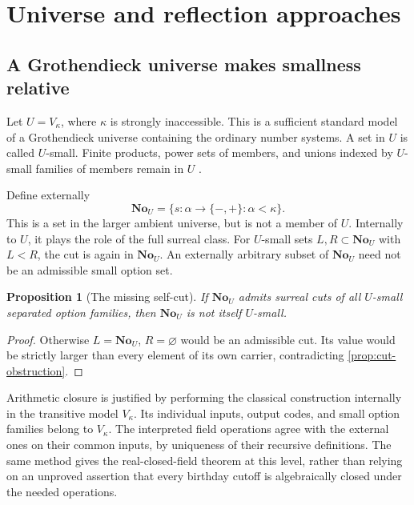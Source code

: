 \documentclass[11pt,letterpaper]{article}
\newtheorem{proposition}[theorem]{Proposition}
\theoremstyle{definition}
\theoremstyle{remark}
\newcommand{\No}{\mathbf{No}}
\numberwithin{equation}{section}
\begin{document}
\section{Universe and reflection approaches}\label{sec:universes}

\subsection{A Grothendieck universe makes smallness relative}
Let \(U=V_\kappa\), where \(\kappa\) is strongly inaccessible. This is a sufficient standard model of a Grothendieck universe containing the ordinary number systems. A set in \(U\) is called \(U\)-small. Finite products, power sets of members, and unions indexed by \(U\)-small families of members remain in \(U\) \cite[\S8]{ShulmanSize}.

Define externally
\begin{equation}\label{eq:NoU}
 \No_U=\{s:\alpha\to\{-,+\}:\alpha<\kappa\}.
\end{equation}
This is a set in the larger ambient universe, but is not a member of \(U\). Internally to \(U\), it plays the role of the full surreal class. For \(U\)-small sets \(L,R\subset\No_U\) with \(L<R\), the cut is again in \(\No_U\). An externally arbitrary subset of \(\No_U\) need not be an admissible small option set.

\begin{proposition}[The missing self-cut]\label{prop:universecut}
If \(\No_U\) admits surreal cuts of all \(U\)-small separated option families, then \(\No_U\) is not itself \(U\)-small.
\end{proposition}
\begin{proof}
Otherwise \(L=\No_U\), \(R=\varnothing\) would be an admissible cut. Its value would be strictly larger than every element of its own carrier, contradicting \cref{prop:cut-obstruction}.
\end{proof}

Arithmetic closure is justified by performing the classical construction internally in the transitive model \(V_\kappa\). Its individual inputs, output codes, and small option families belong to \(V_\kappa\). The interpreted field operations agree with the external ones on their common inputs, by uniqueness of their recursive definitions. The same method gives the real-closed-field theorem at this level, rather than relying on an unproved assertion that every birthday cutoff is algebraically closed under the needed operations.
\end{document}

